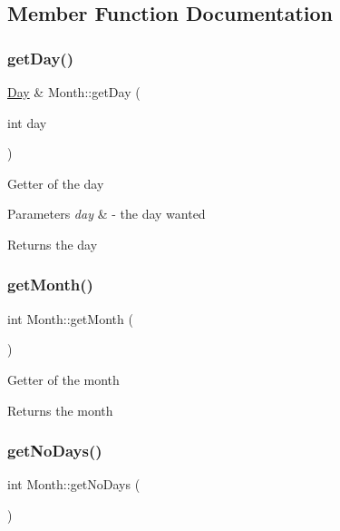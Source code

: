 \subsection{Member Function Documentation}
\mbox{\label{class_month_aea6a1844798c684548c1de899cf620b2}} 
\subsubsection{\texorpdfstring{get\+Day()}{getDay()}}
{\footnotesize\ttfamily \mbox{\hyperlink{class_day}{Day}} \& Month\+::get\+Day (\begin{DoxyParamCaption}\item[{int}]{day }\end{DoxyParamCaption})}

Getter of the day 
\begin{DoxyParams}{Parameters}
{\em day} & -\/ the day wanted \\
\hline
\end{DoxyParams}
\begin{DoxyReturn}{Returns}
the day 
\end{DoxyReturn}
\mbox{\label{class_month_a5bc7c527734f8bc303fea424cd265357}} 
\subsubsection{\texorpdfstring{get\+Month()}{getMonth()}}
{\footnotesize\ttfamily int Month\+::get\+Month (\begin{DoxyParamCaption}{ }\end{DoxyParamCaption})}

Getter of the month \begin{DoxyReturn}{Returns}
the month 
\end{DoxyReturn}
\mbox{\label{class_month_a901b9af10fe3f3dab931927c2ab77440}} 
\subsubsection{\texorpdfstring{get\+No\+Days()}{getNoDays()}}
{\footnotesize\ttfamily int Month\+::get\+No\+Days (\begin{DoxyParamCaption}{ }\end{DoxyParamCaption})}



